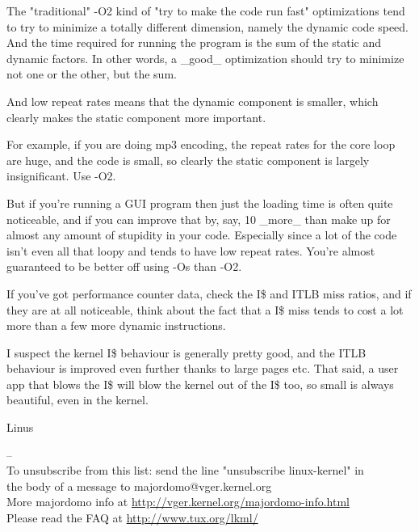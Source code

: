 \begin{insertnote}
The "traditional" -O2 kind of "try to make the code run fast" 
optimizations tend to try to minimize a totally different dimension, 
namely the dynamic code speed.
And the time required for running the program is the sum of the static and 
dynamic factors. In other words, a \_good\_ optimization should try to 
minimize not one or the other, but the sum.

And low repeat rates means that the dynamic component is smaller, which 
clearly makes the static component more important.

For example, if you are doing mp3 encoding, the repeat rates for the core 
loop are huge, and the code is small, so clearly the static component is 
largely insignificant. Use -O2.

But if you're running a GUI program then just the loading time is often
quite noticeable, and if you can improve that by, say, 10%
\_more\_ than make up for almost any amount of stupidity in your code.  
Especially since a lot of the code isn't even all that loopy and tends to
have low repeat rates. You're almost guaranteed to be better off using -Os
than -O2.

If you've got performance counter data, check the I\$ and ITLB miss ratios, 
and if they are at all noticeable, think about the fact that a I\$ miss 
tends to cost a lot more than a few more dynamic instructions. 

I suspect the kernel I\$ behaviour is generally pretty good, and the ITLB 
behaviour is improved even further thanks to large pages etc. That said, a 
user app that blows the I\$ will blow the kernel out of the I\$ too, so 
small is always beautiful, even in the kernel.

\qquad Linus

--\\
To unsubscribe from this list: send the line "unsubscribe linux-kernel" in \\
the body of a message to majordomo@vger.kernel.org \\
More majordomo info at  \url{http://vger.kernel.org/majordomo-info.html}\\
Please read the FAQ at  \url{http://www.tux.org/lkml/}

\end{insertnote}

